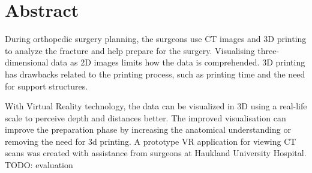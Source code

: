 \documentclass[a4paper]{report}
\begin{document}
%
%


\makeatletter
{}
\def\lst@SkipToFirst{%
    \lst@ifmatchrangestart\c@lstnumber=\numexpr-1+\lst@firstline\fi
    \ifnum \lst@lineno<\lst@firstline
        \def\lst@next{\lst@BeginDropInput\lst@Pmode
        \lst@Let{13}\lst@MSkipToFirst
        \lst@Let{10}\lst@MSkipToFirst}%
        \expandafter\lst@next
    \else
        \expandafter\lst@BOLGobble
    \fi}
\makeatother



\titlePage
\pagebreak

\section*{Abstract}
During orthopedic surgery planning, the surgeons use CT images and 3D printing to analyze the fracture and help prepare for the surgery.
Visualising three-dimensional data as 2D images limits how the data is comprehended. 3D printing has drawbacks related to the printing process, such as printing time and the need for support structures.

With Virtual Reality technology, the data can be visualized in 3D using a real-life scale to perceive depth and distances better. The improved visualisation can improve the preparation phase by increasing the anatomical understanding or removing the need for 3d printing.
A prototype VR application for viewing CT scans was created with assistance from surgeons at Haukland University Hospital.
TODO: evaluation
\end{document}
